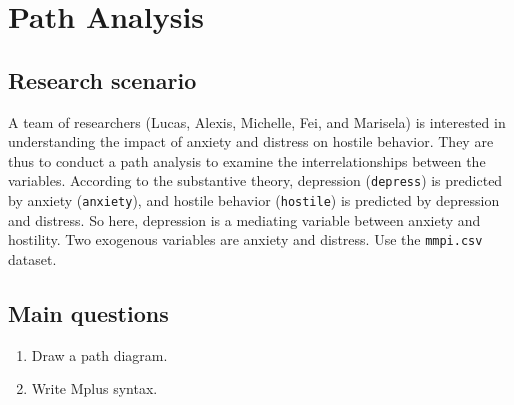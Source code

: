 \documentclass[
]{book}
\begin{document}
\chapter{Path Analysis}\label{path-analysis}

\section{Research scenario}\label{research-scenario}

A team of researchers (Lucas, Alexis, Michelle, Fei, and Marisela) is interested in understanding the impact of anxiety and distress on hostile behavior. They are thus to conduct a path analysis to examine the interrelationships between the variables. According to the substantive theory, depression (\texttt{depress}) is predicted by anxiety (\texttt{anxiety}), and hostile behavior (\texttt{hostile}) is predicted by depression and distress. So here, depression is a mediating variable between anxiety and hostility. Two exogenous variables are anxiety and distress. Use the \texttt{mmpi.csv} dataset.

\section{Main questions}\label{main-questions}

\begin{enumerate}
\def\labelenumi{\arabic{enumi}.}
\item
  Draw a path diagram.
\item
  Write Mplus syntax.
\end{enumerate}
\end{document}
